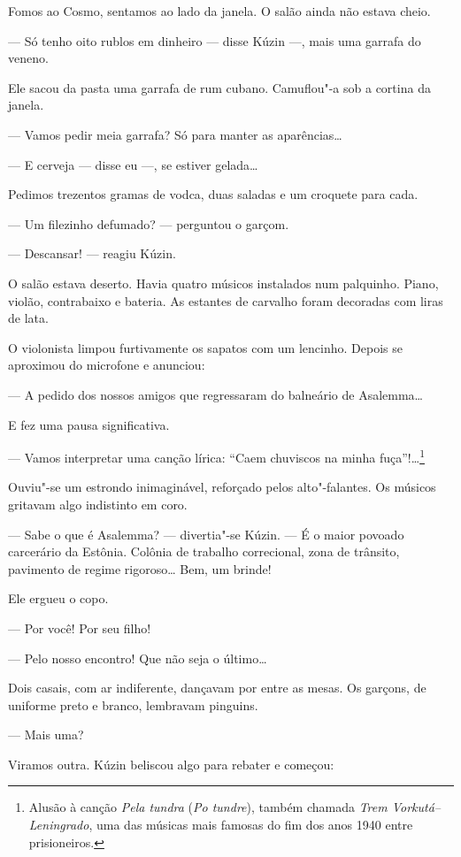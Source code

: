 Fomos ao Cosmo, sentamos ao lado da janela. O salão ainda não estava
cheio. %

--- Só tenho oito rublos em dinheiro --- disse Kúzin ---, mais uma
garrafa do veneno.

Ele sacou da pasta uma garrafa de rum cubano. Camuflou"-a sob a cortina
da janela.

--- Vamos pedir meia garrafa? Só para manter as aparências\ldots{}

--- E cerveja --- disse eu ---, se estiver gelada\ldots{}

Pedimos trezentos gramas de vodca, duas saladas e um croquete para cada.

--- Um filezinho defumado? --- perguntou o garçom.

--- Descansar! --- reagiu Kúzin.

O salão estava deserto. Havia quatro músicos instalados num palquinho.
Piano, violão, contrabaixo e bateria. As estantes de carvalho foram
decoradas com liras de lata.

O violonista limpou furtivamente os sapatos com um lencinho. Depois se
aproximou do microfone e anunciou:

--- A pedido dos nossos amigos que regressaram do balneário de
Asalemma\ldots{}

E fez uma pausa significativa.

--- Vamos interpretar uma canção lírica: ``Caem chuviscos na minha
fuça''!\ldots{}\footnote{Alusão à canção \emph{Pela tundra} (\emph{Po
  tundre}), também chamada \emph{Trem Vorkutá--Leningrado}, uma
  das músicas mais famosas do fim dos anos 1940 entre prisioneiros.}

Ouviu"-se um estrondo inimaginável, reforçado pelos alto"-falantes. Os
músicos gritavam algo indistinto em coro.

--- Sabe o que é Asalemma? --- divertia"-se Kúzin. --- É o maior povoado
carcerário da Estônia. Colônia de trabalho correcional, zona de
trânsito, pavimento de regime rigoroso\ldots{} Bem, um brinde!

Ele ergueu o copo.

--- Por você! Por seu filho!

--- Pelo nosso encontro! Que não seja o último\ldots{}

Dois casais, com ar indiferente, dançavam por entre as mesas. Os
garçons, de uniforme preto e branco, lembravam pinguins.

--- Mais uma?

Viramos outra. Kúzin beliscou algo para rebater e começou:


